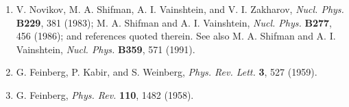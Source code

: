 \begin{enumerate}
\item\label{ref:12.20} V. Novikov, M. A. Shifman, A. I. Vainshtein, and
V. I. Zakharov, \emph{Nucl. Phys.} \textbf{B229}, 381 (1983);
M. A. Shifman and A. I. Vainshtein, \emph{Nucl. Phys.} \textbf{B277}, 456
(1986); and references quoted therein. See also M. A. Shifman and
A. I. Vainshtein, \emph{Nucl. Phys.} \textbf{B359}, 571 (1991).

\item\label{ref:12.21} G. Feinberg, P. Kabir, and S. Weinberg,
\emph{Phys. Rev. Lett.} \textbf{3}, 527 (1959).

\item\label{ref:12.22} G. Feinberg, \emph{Phys. Rev.} \textbf{110}, 1482
(1958).
\end{enumerate}
